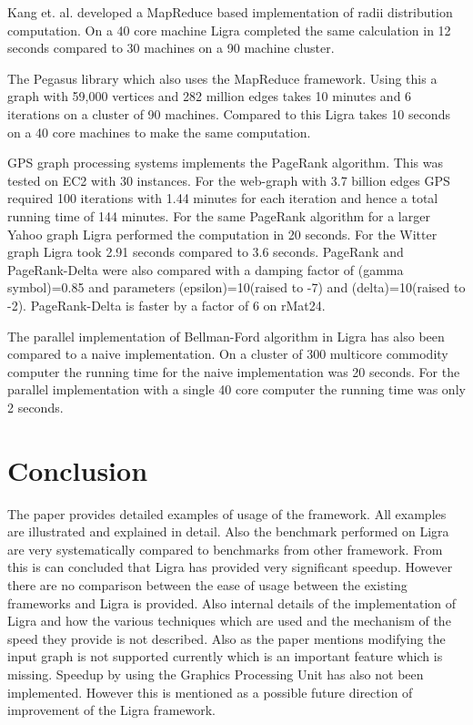 \documentclass[a4paper,10pt,twoside]{article}
\begin{document}
Kang et. al. developed a MapReduce based implementation of radii distribution computation. On a 40 core machine Ligra completed the same calculation in 12 seconds compared to 30 machines on a 90 machine cluster.


The Pegasus library which also uses the MapReduce framework. Using this a graph with 59,000 vertices and 282 million edges takes 10 minutes and 6 iterations on a cluster of 90 machines. Compared to this Ligra takes 10 seconds on a 40 core machines to make the same computation.

GPS graph processing systems implements the PageRank algorithm. This was tested on EC2 with 30 instances. For the web-graph with 3.7 billion edges GPS required 100 iterations with 1.44 minutes for each iteration and hence a total running time of 144 minutes. For the same PageRank algorithm for a larger Yahoo graph Ligra performed the computation in 20 seconds. For the Witter graph Ligra took 2.91 seconds compared to 3.6 seconds. PageRank and PageRank-Delta were also compared with a damping factor of (gamma symbol)=0.85 and parameters (epsilon)=10(raised to -7) and (delta)=10(raised to -2). PageRank-Delta is faster by a factor of 6 on rMat24.

The parallel implementation of Bellman-Ford algorithm in Ligra has also been compared to a naive implementation. On a cluster of 300 multicore commodity computer the running time for the naive implementation was 20 seconds. For the parallel implementation with a single 40 core computer the running time was only 2 seconds.


\section{Conclusion}

The paper provides detailed examples of usage of the framework. All examples are illustrated and explained in detail. Also the benchmark performed on Ligra are very systematically compared to benchmarks from other framework. From this is can concluded that Ligra has provided very significant speedup. However there are no comparison between the ease of usage between the existing frameworks and Ligra is provided. Also internal details of the implementation of Ligra and how the various techniques which are used and the mechanism of the speed they provide is not described. Also as the paper mentions modifying the input graph is not supported currently which is an important feature which is missing. Speedup by using the Graphics Processing Unit has also not been implemented. However this is mentioned as a possible future direction of improvement of the Ligra framework.


 
\end{document}
